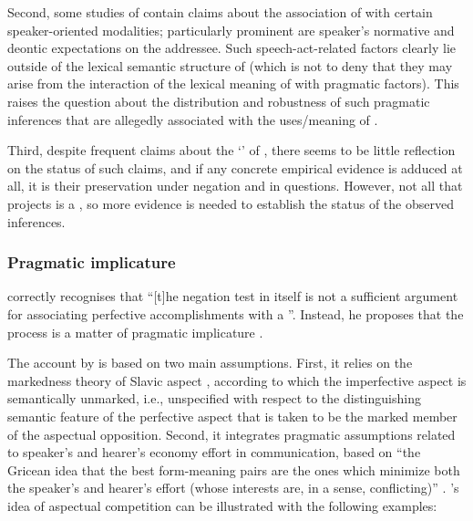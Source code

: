  Second, some studies of  \citep[here represented by][]{Paducheva:96, Romanova:06} contain claims about the association of  with certain speaker-oriented modalities; particularly prominent are speaker's normative and deontic expectations on the addressee. Such speech-act-related factors clearly lie outside of the lexical semantic structure of  (which is not to deny that they may arise from the interaction of the lexical meaning of  with pragmatic factors). This raises the question about the distribution and robustness of such pragmatic inferences that are allegedly associated with the uses/meaning of . 

 Third, despite frequent claims about the `' of , there seems to be little reflection on the status of such claims, and if any concrete empirical evidence is adduced at all, it is their preservation under negation and in questions. However, not all that projects is a  \citep[see, e.g.,][]{ChierchiaMcConnell-Ginet:90, Beaver:01, Potts:05}, so more evidence is needed to establish the status of the observed inferences.

\subsubsection{Pragmatic implicature}
\citet[61]{Gronn:04} correctly recognises that ``[t]he negation test in itself is not a sufficient argument for associating perfective accomplishments with a ''. Instead, he proposes that the process  is a matter of pragmatic implicature \citep{Grice:75}.

The account by \citet{Gronn:04, Gronn:06} is based on two main assumptions. First, it relies on the markedness theory of Slavic aspect \citep{Maslov:58, Jakobson:71}, according to which the imperfective aspect is semantically unmarked, i.e., unspecified with respect to the distinguishing semantic feature of the perfective
aspect that is taken to be the marked member of the aspectual opposition.
Second, it integrates pragmatic assumptions related to speaker's and hearer's economy effort in communication, based on ``the Gricean idea that the best form-meaning pairs are the ones which minimize both the speaker's and hearer's effort (whose interests are, in a sense, conflicting)'' \citep[][71]{Gronn:06}. \citeauthor{Gronn:06}'s idea of aspectual competition can be illustrated with the following examples:


